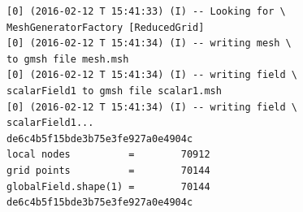 \begin{lstlisting}[style=BashStyle]
[0] (2016-02-12 T 15:41:33) (I) -- Looking for \ 
MeshGeneratorFactory [ReducedGrid]
[0] (2016-02-12 T 15:41:34) (I) -- writing mesh \ 
to gmsh file mesh.msh
[0] (2016-02-12 T 15:41:34) (I) -- writing field \ 
scalarField1 to gmsh file scalar1.msh
[0] (2016-02-12 T 15:41:34) (I) -- writing field \
scalarField1...
de6c4b5f15bde3b75e3fe927a0e4904c                                                                                                                                                                                                                                                                                                                                                                                                                                                                                                                                                                                                                                                                                                                                                                                                                                                                                                                                                                                                                                
local nodes          =        70912
grid points          =        70144
globalField.shape(1) =        70144
de6c4b5f15bde3b75e3fe927a0e4904c                                                                                                                                                                                                                                                                                                                                                                                                                                                                                                                                                                                                                                                                                                                                                                                                                                                                                                                                                                                                                                

\end{lstlisting}
